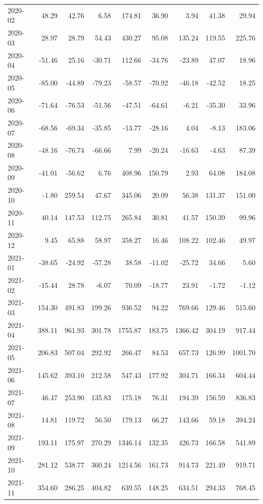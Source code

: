 \begin{table}[ht]
\begin{tabular}{lrrrrrrrr}
  2020-02 & 48.29 & 42.76 & 6.58 & 174.81 & 36.90 & 3.94 & 41.38 & 29.94 \\ 
  2020-03 & 28.97 & 28.79 & 54.43 & 430.27 & 95.08 & 135.24 & 119.55 & 225.76 \\ 
  2020-04 & -51.46 & 25.16 & -30.71 & 112.66 & -34.76 & -23.89 & 47.07 & 18.96 \\ 
  2020-05 & -85.00 & -44.89 & -79.23 & -58.57 & -70.92 & -46.18 & -42.52 & 18.25 \\ 
  2020-06 & -71.64 & -76.53 & -51.56 & -47.51 & -64.61 & -6.21 & -35.30 & 33.96 \\ 
  2020-07 & -68.56 & -69.34 & -35.85 & -13.77 & -28.16 & 4.04 & -8.13 & 183.06 \\ 
  2020-08 & -48.16 & -76.74 & -66.66 & 7.99 & -20.24 & -16.63 & -4.63 & 87.39 \\ 
  2020-09 & -41.01 & -56.62 & 6.76 & 408.96 & 150.79 & 2.93 & 64.08 & 184.08 \\ 
  2020-10 & -1.80 & 259.54 & 47.67 & 345.06 & 20.09 & 56.38 & 131.37 & 151.00 \\ 
  2020-11 & 40.14 & 147.53 & 112.75 & 265.84 & 30.81 & 41.57 & 150.39 & 99.96 \\ 
  2020-12 & 9.45 & 65.88 & 58.97 & 358.27 & 16.46 & 108.22 & 102.46 & 49.97 \\ 
  2021-01 & -38.65 & -24.92 & -57.28 & 38.58 & -11.02 & -25.72 & 34.66 & 5.60 \\ 
  2021-02 & -15.44 & 28.78 & -6.07 & 70.09 & -18.77 & 23.91 & -1.72 & -1.12 \\ 
  2021-03 & 154.30 & 491.83 & 199.26 & 936.52 & 94.22 & 769.66 & 129.46 & 515.60 \\ 
  2021-04 & 388.11 & 961.93 & 301.78 & 1755.87 & 183.75 & 1366.42 & 304.19 & 917.44 \\ 
  2021-05 & 206.83 & 507.04 & 292.92 & 266.47 & 84.53 & 657.73 & 126.99 & 1001.70 \\ 
  2021-06 & 145.62 & 393.10 & 212.58 & 547.43 & 177.92 & 304.71 & 166.34 & 604.44 \\ 
  2021-07 & 46.47 & 253.90 & 135.83 & 175.18 & 76.31 & 194.39 & 156.59 & 836.83 \\ 
  2021-08 & 14.81 & 119.72 & 56.50 & 179.13 & 66.27 & 143.66 & 59.18 & 394.24 \\ 
  2021-09 & 193.11 & 175.97 & 270.29 & 1346.14 & 132.35 & 426.73 & 166.58 & 541.89 \\ 
  2021-10 & 281.12 & 538.77 & 360.24 & 1214.56 & 161.73 & 914.73 & 221.49 & 919.71 \\ 
  2021-11 & 354.60 & 286.25 & 404.82 & 639.55 & 148.25 & 634.51 & 294.33 & 768.45 \\ 

\end{tabular}
\end{table}
